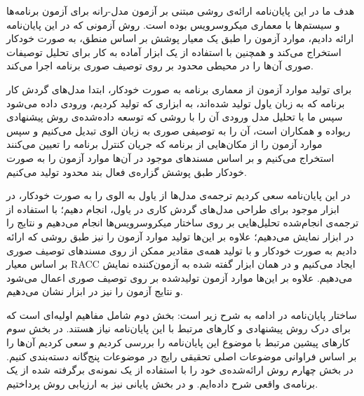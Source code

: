 
هدف ما در این پایان‌نامه ارائه‌ی روشی مبتنی بر آزمون مدل-رانه برای آزمون برنامه‌ها و سیستم‌ها با معماری میکروسرویس بوده‌ است. روش آزمونی که در این پایان‌نامه ارائه دادیم، موارد آزمون را طبق یک معیار پوشش بر اساس منطق، به صورت خودکار استخراج می‌کند و همچنین با استفاده از یک ابزار آماده به کار برای تحلیل توصیفات صوری آن‌ها را در محیطی محدود بر روی توصیف صوری برنامه اجرا می‌کند.

برای تولید موارد آزمون از معماری برنامه به صورت خودکار، ابتدا مدل‌های گردش کار برنامه که به زبان یاول تولید شده‌اند، به ابزاری که تولید کردیم، ورودی داده می‌شود سپس ما با تحلیل مدل ورودی آن را با روشی که توسعه داده‌شده‌ی روش پیشنهادی ریواده و همکاران است، آن را به توصیفی صوری به زبان الوی تبدیل می‌کنیم و سپس موارد آزمون را از مکان‌هایی از برنامه که جریان کنترل برنامه را تعیین می‌کنند استخراج می‌کنیم و بر اساس مسندهای موجود در آن‌ها موارد آزمون را به صورت خودکار طبق پوشش گزاره‌ی فعال بند محدود تولید می‌کنیم.

در این پایان‌نامه سعی کردیم ترجمه‌ی مدل‌ها از یاول به الوی را به صورت خودکار، در ابزار موجود برای طراحی مدل‌های گردش کاری در یاول، انجام دهیم؛ با استفاده از ترجمه‌ی انجام‌شده تحلیل‌هایی بر روی ساختار میکروسرویس‌ها انجام می‌دهیم و نتایج را در ابزار نمایش می‌دهیم؛ علاوه بر این‌ها تولید موارد آزمون را نیز طبق روشی که ارائه دادیم به صورت خودکار و با تولید همه‌ی مقادیر ممکن از روی مسندهای توصیف صوری بر اساس معیار RACC ایجاد می‌کنیم و در همان ابزار گفته شده به آزمون‌کننده‌ نمایش می‌دهیم. علاوه بر این‌ها موارد آزمون تولید‌شده بر روی توصیف صوری اعمال می‌شود و نتایج آزمون را نیز در ابزار نشان می‌دهیم.



ساختار پایان‌نامه در ادامه به شرح زیر است: بخش دوم شامل مفاهیم اولیه‌ای است که برای درک روش پیشنهادی و کارهای مرتبط با این پایان‌نامه نیاز هستند. در بخش سوم کارهای پیشین مرتبط با موضوع این پایان‌نامه را بررسی کردیم و سعی کردیم آن‌ها را بر اساس فراوانی موضوعات اصلی تحقیقی رایج در موضوعات پنج‌گانه دسته‌بندی کنیم. در بخش چهارم روش ارائه‌شده‌ی خود را با استفاده از یک نمونه‌ی برگرفته شده از یک برنامه‌ی واقعی شرح داده‌ایم. و در بخش پایانی نیز به ارزیابی روش پرداختیم. 

